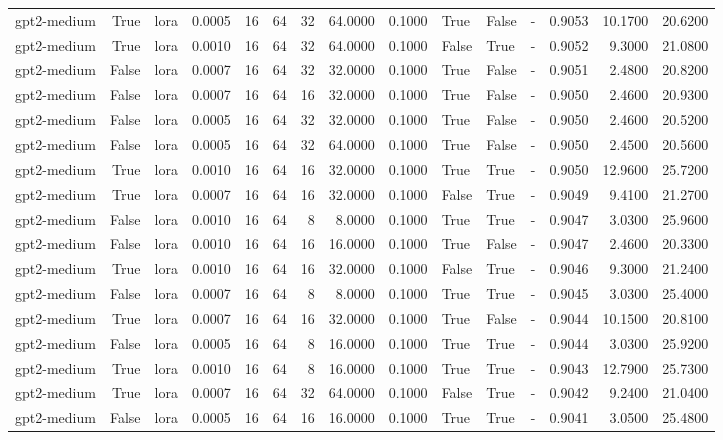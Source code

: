 \begin{tabular}{lrlrrrrrrlllrrr}
gpt2-medium & True & lora & 0.0005 & 16 & 64 & 32 & 64.0000 & 0.1000 & True & False & - & 0.9053 & 10.1700 & 20.6200 \\
gpt2-medium & True & lora & 0.0010 & 16 & 64 & 32 & 64.0000 & 0.1000 & False & True & - & 0.9052 & 9.3000 & 21.0800 \\
gpt2-medium & False & lora & 0.0007 & 16 & 64 & 32 & 32.0000 & 0.1000 & True & False & - & 0.9051 & 2.4800 & 20.8200 \\
gpt2-medium & False & lora & 0.0007 & 16 & 64 & 16 & 32.0000 & 0.1000 & True & False & - & 0.9050 & 2.4600 & 20.9300 \\
gpt2-medium & False & lora & 0.0005 & 16 & 64 & 32 & 32.0000 & 0.1000 & True & False & - & 0.9050 & 2.4600 & 20.5200 \\
gpt2-medium & False & lora & 0.0005 & 16 & 64 & 32 & 64.0000 & 0.1000 & True & False & - & 0.9050 & 2.4500 & 20.5600 \\
gpt2-medium & True & lora & 0.0010 & 16 & 64 & 16 & 32.0000 & 0.1000 & True & True & - & 0.9050 & 12.9600 & 25.7200 \\
gpt2-medium & True & lora & 0.0007 & 16 & 64 & 16 & 32.0000 & 0.1000 & False & True & - & 0.9049 & 9.4100 & 21.2700 \\
gpt2-medium & False & lora & 0.0010 & 16 & 64 & 8 & 8.0000 & 0.1000 & True & True & - & 0.9047 & 3.0300 & 25.9600 \\
gpt2-medium & False & lora & 0.0010 & 16 & 64 & 16 & 16.0000 & 0.1000 & True & False & - & 0.9047 & 2.4600 & 20.3300 \\
gpt2-medium & True & lora & 0.0010 & 16 & 64 & 16 & 32.0000 & 0.1000 & False & True & - & 0.9046 & 9.3000 & 21.2400 \\
gpt2-medium & False & lora & 0.0007 & 16 & 64 & 8 & 8.0000 & 0.1000 & True & True & - & 0.9045 & 3.0300 & 25.4000 \\
gpt2-medium & True & lora & 0.0007 & 16 & 64 & 16 & 32.0000 & 0.1000 & True & False & - & 0.9044 & 10.1500 & 20.8100 \\
gpt2-medium & False & lora & 0.0005 & 16 & 64 & 8 & 16.0000 & 0.1000 & True & True & - & 0.9044 & 3.0300 & 25.9200 \\
gpt2-medium & True & lora & 0.0010 & 16 & 64 & 8 & 16.0000 & 0.1000 & True & True & - & 0.9043 & 12.7900 & 25.7300 \\
gpt2-medium & True & lora & 0.0007 & 16 & 64 & 32 & 64.0000 & 0.1000 & False & True & - & 0.9042 & 9.2400 & 21.0400 \\
gpt2-medium & False & lora & 0.0005 & 16 & 64 & 16 & 16.0000 & 0.1000 & True & True & - & 0.9041 & 3.0500 & 25.4800 \\

\end{tabular}
